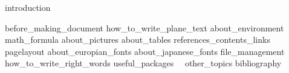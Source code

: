 \documentclass[dvipdfmx, fleqn]{jreport}
\begin{document}

{introduction}

{before_making_document}
{how_to_write_plane_text}
{about_environment}
{math_formula}
{about_pictures}
{about_tables}
{references_contents_links}		%
{pagelayout}			%
{about_europian_fonts}	%
{about_japanese_fonts}	%
{file_management}
{how_to_write_right_words}		%
{useful_packages}　			%
{other_topics}
{bibliography}
\end{document}
